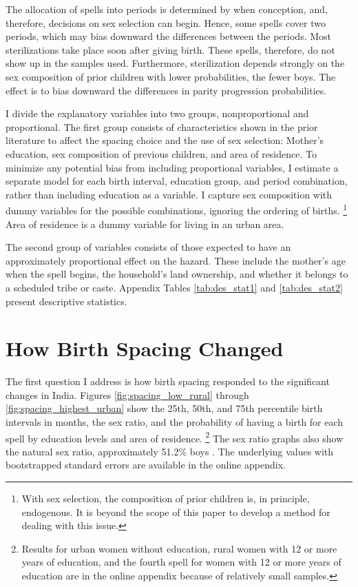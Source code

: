 \documentclass[12pt,letterpaper]{article}
\begin{document}
The allocation of spells into periods is determined by when conception, and, therefore, 
decisions on sex selection can begin. 
Hence, some spells cover two periods, which may bias downward the differences between the 
periods.
Most sterilizations take place soon after giving birth. 
These spells, therefore, do not show up in the samples used. 
Furthermore, sterilization depends strongly on the sex composition of prior children
with lower probabilities, the fewer boys. 
The effect is to bias downward the differences in parity progression probabilities.

I divide the explanatory variables into two groups, nonproportional and proportional. 
The first group consists of characteristics shown in the prior literature to affect the 
spacing choice and the use of sex selection: Mother’s education, sex composition of 
previous children, and area of residence. 
To minimize any potential bias from including proportional variables, I estimate a 
separate model for each birth interval, education group, and period combination, rather 
than including education as a variable. 
I capture sex composition with dummy variables for the possible combinations, ignoring 
the ordering of births.%
\footnote{
With sex selection, the composition of prior children is, in principle, endogenous. 
It is beyond the scope of this paper to develop a method for dealing with this issue. 
}
Area of residence is a dummy variable for living in an urban area.

The second group of variables consists of those expected to have an approximately 
proportional effect on the hazard.
These include the mother's age when the spell begins, the household's
land ownership, and whether it belongs to a scheduled tribe or caste.
Appendix Tables \ref{tab:des_stat1} and \ref{tab:des_stat2} present descriptive statistics.


\section{How Birth Spacing Changed\label{sec:results}}

The first question I address is how birth spacing responded to the significant 
changes in India.
Figures \ref{fig:spacing_low_rural} through \ref{fig:spacing_highest_urban}
show the 25th, 50th, and 75th percentile birth intervals in 
months, the sex ratio, and the probability of having a birth for each spell
by education levels and area of residence.%
\footnote{
Results for urban women without education, rural women with 12 or more years of 
education, and the fourth spell for women with 12 or more years of education are
in the online appendix because of relatively small samples.
}
The sex ratio graphs also show the natural sex ratio, approximately 51.2\% boys
\citep{ben-porath76b,jacobsen99,Portner2015b}.
The underlying values with bootstrapped standard errors are available in the online 
appendix.
\end{document}
